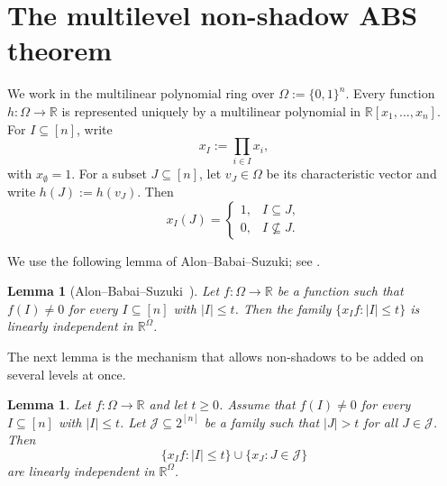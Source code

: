\documentclass[11pt]{article}
\theoremstyle{plain}
\newtheorem{lemma}[theorem]{Lemma}
\theoremstyle{remark}
\newcommand{\abs}[1]{\left|#1\right|}
\begin{document}
\section{The multilevel non-shadow ABS theorem}\label{sec:proof-main}

We work in the multilinear polynomial ring over $\Omega:=\{0,1\}^n$.
Every function $h:\Omega\to \mathbb{R}$ is represented uniquely by a multilinear polynomial in
$\mathbb{R}[x_1,\dots,x_n]$.
For $I\subseteq[n]$, write
$$
  x_I:=\prod_{i\in I}x_i,
$$
with $x_\emptyset=1$.
For a subset $J\subseteq[n]$, let $v_J\in\Omega$ be its characteristic vector and write $h(J):=h(v_J)$.
Then
\begin{equation}\label{eq:indicator}
  x_I(J)=\begin{cases}
    1,& I\subseteq J,\\
    0,& I\nsubseteq J.
  \end{cases}
\end{equation}

We use the following lemma of Alon--Babai--Suzuki; see \cite[Lemma~2.1]{ABS}.

\begin{lemma}[Alon--Babai--Suzuki~\cite{ABS}]\label{lem:ABS21}
Let $f:\Omega\to\mathbb{R}$ be a function such that $f(I)\neq 0$ for every $I\subseteq[n]$ with $\abs{I}\le t$.
Then the family $\{x_I f:\abs{I}\le t\}$ is linearly independent in $\mathbb{R}^{\Omega}$.
\end{lemma}

The next lemma is the mechanism that allows non-shadows to be added on several levels at once.

\begin{lemma}\label{lem:adjoin}
Let $f:\Omega\to\mathbb{R}$ and let $t\ge 0$.
Assume that $f(I)\neq 0$ for every $I\subseteq[n]$ with $\abs{I}\le t$.
Let $\mathcal{J}\subseteq2^{[n]}$ be a family such that $\abs{J}>t$ for all $J\in\mathcal{J}$.
Then
$$
  \{x_I f:\abs{I}\le t\}\cup\{x_J:J\in\mathcal{J}\}
$$
are linearly independent in $\mathbb{R}^{\Omega}$.
\end{lemma}
\end{document}
